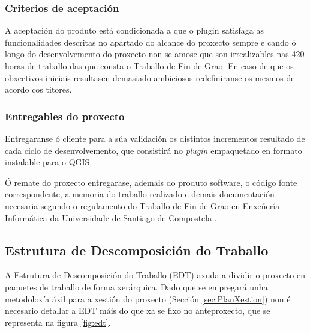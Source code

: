 \subsubsection{Criterios de aceptación}
A aceptación do produto está condicionada a que o plugin satisfaga as funcionalidades descritas no apartado do alcance do proxecto sempre e cando ó longo do desenvolvemento do proxecto non se amose que son irrealizables nas 420 horas de traballo das que consta o Traballo de Fin de Grao. En caso de que os obxectivos iniciais resultasen demasiado ambiciosos redefiniranse os mesmos de acordo cos titores.

\subsubsection{Entregables do proxecto}\label{sss:entregables}
Entregaranse ó cliente para a súa validación os distintos incrementos resultado de cada ciclo de desenvolvemento, que consistirá no \emph{plugin} empaquetado en formato instalable para o QGIS.

Ó remate do proxecto entregarase, ademais do produto software, o código fonte correspondente, a memoria do traballo realizado e demais documentación necesaria segundo o regulamento do Traballo de Fin de Grao en Enxeñería Informática da Universidade de Santiago de Compostela \cite{ReglamentoTFG}.

\subsection{Estrutura de Descomposición do Traballo}
A Estrutura de Descomposición do Traballo (EDT) axuda a dividir o proxecto en paquetes de traballo de forma xerárquica. Dado que se empregará unha metodoloxía áxil para a xestión do proxecto (Sección \ref{sec:PlanXestion}) non é necesario detallar a EDT máis do que xa se fixo no anteproxecto, que se representa na figura \ref{fig:edt}.

